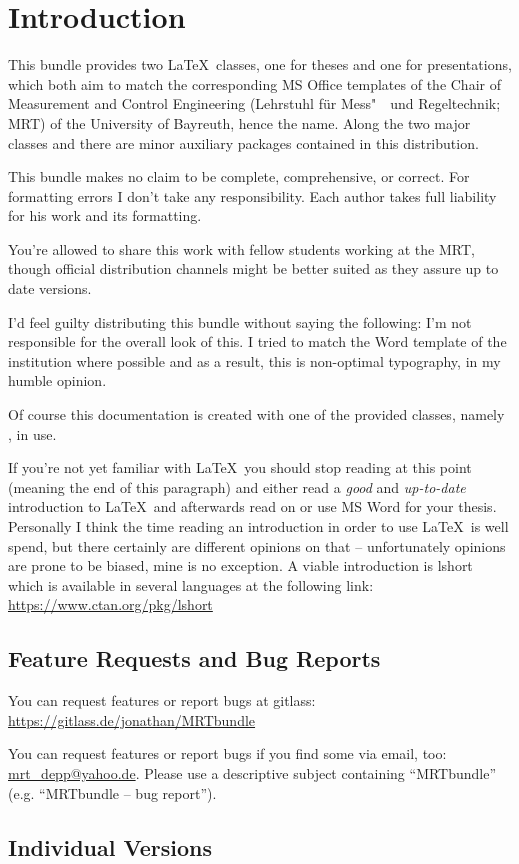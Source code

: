 \chapter{Introduction}
This bundle provides two \LaTeX\ classes, one for theses and one for
presentations, which both aim to match the corresponding MS Office templates of
the Chair of Measurement and Control Engineering (Lehrstuhl für Mess"~~und
Regeltechnik; MRT) of the University of Bayreuth, hence the name. Along the two
major classes  and  there are minor auxiliary
packages contained in this distribution.

This bundle makes no claim to be complete, comprehensive, or correct. For
formatting errors I don't take any responsibility. Each author takes full
liability for his work and its formatting.

You're allowed to share this work with fellow students working at the MRT,
though official distribution channels might be better suited as they assure up
to date versions.

I'd feel guilty distributing this bundle without saying the following: I'm not
responsible for the overall look of this. I tried to match the Word template of
the institution where possible and as a result, this is non-optimal typography,
in my humble opinion.

Of course this documentation is created with one of the provided classes, namely
, in use.

If you're not yet familiar with \LaTeX\ you should stop reading at this point
(meaning the end of this paragraph) and either read a \emph{good} and
\emph{up-to-date} introduction to \LaTeX\ and afterwards read on or use MS Word
for your thesis. Personally I think the time reading an introduction in order to
use \LaTeX\ is well spend, but there certainly are different opinions on that --
unfortunately opinions are prone to be biased, mine is no exception. A viable
introduction is lshort which is available in several languages at the following
link: \url{https://www.ctan.org/pkg/lshort}

\section{Feature Requests and Bug Reports}\label{sec:bugs}
You can request features or report bugs at gitlass:
\url{https://gitlass.de/jonathan/MRTbundle}

You can request features or report bugs if you find some via
email, too:
\href{mailto:mrt_depp@yahoo.de?subject=MRTbundle -- bug report}
  {mrt\_depp@yahoo.de}.
Please use a descriptive subject containing ``MRTbundle'' (e.g. ``MRTbundle --
bug report'').

\section{Individual Versions}
\docIndividualVersions
